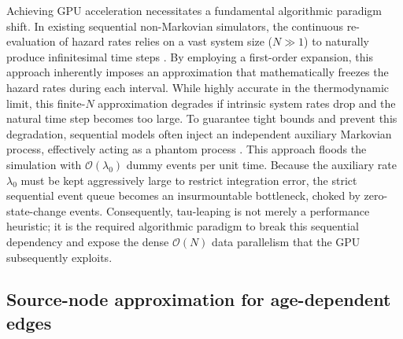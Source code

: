 \documentclass[a4paper,fleqn]{cas-sc}
\theoremstyle{definition}
\theoremstyle{remark}
\begin{document}
Achieving GPU acceleration necessitates a fundamental algorithmic paradigm shift. In existing sequential non-Markovian simulators, the continuous re-evaluation of hazard rates relies on a vast system size ($N \gg 1$) to naturally produce infinitesimal time steps \citep{boguna2014simulating}. By employing a first-order expansion, this approach inherently imposes an approximation that mathematically freezes the hazard rates during each interval. While highly accurate in the thermodynamic limit, this finite-$N$ approximation degrades if intrinsic system rates drop and the natural time step becomes too large. To guarantee tight bounds and prevent this degradation, sequential models often inject an independent auxiliary Markovian process, effectively acting as a phantom process \citep{vajdi2020stochastic}. This approach floods the simulation with $\mathcal{O}(\lambda_0)$ dummy events per unit time. Because the auxiliary rate $\lambda_0$ must be kept aggressively large to restrict integration error, the strict sequential event queue becomes an insurmountable bottleneck, choked by zero-state-change events. Consequently, tau-leaping is not merely a performance heuristic; it is the required algorithmic paradigm to break this sequential dependency and expose the dense $\mathcal{O}(N)$ data parallelism that the GPU subsequently exploits.

\subsection{Source-node approximation for age-dependent edges}
\label{sec:source_node_approx}
\end{document}
